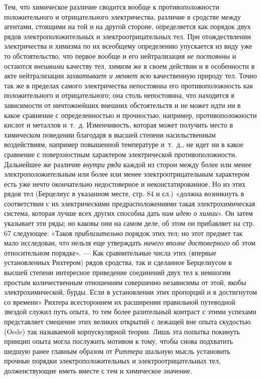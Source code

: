 Тем, что химическое различие сводится вообще к противоположности
положительного и отрицательного электричества, различие в сродстве между
агентами, стоящими на той и на другой стороне, определяется как порядок
двух рядов электроположительных и электроотрицательных тел. При
отождествлении электричества и химизма по их всеобщему определению
упускается из виду уже то обстоятельство, что первое вообще и его
нейтрализация {\em не постоянны} и остаются
{\em внешними} качеству тел, химизм же в своем действии
и в особенности в акте нейтрализации {\em захватывает и
меняет всю} качественную природу тел. Точно так же в пределах самого
электричества непостоянна его противоположность как положительного и
отрицательного; она столь непостоянна, что находится в зависимости от
ничтожнейших внешних обстоятельств и не может идти ни в какое сравнение с
определенностью и прочностью, например, противоположности кислот и металлов
и~т.~д. Изменчивость, которая может получить место в химическом поведении
благодаря в высшей степени насильственным воздействиям, например повышенной
температуре и~т.~д., не идет ни в какое сравнение с поверхностным
характером электрической противоположности. Дальнейшее же различие
{\em внутри ряда} каждой из сторон между более или
менее электроположительным или более или менее электроотрицательным
характером есть уже нечто окончательно недостоверное и неконстатированное.
Но из этих рядов тел (Берцелиус в указанном месте, стр. 84 и сл.) «должна
возникнуть в соответствии с их электрическими предрасположениями такая
электрохимическая система, которая лучше всех других способна дать нам
{\em идею о химии}». Он затем указывает эти ряды; но
каковы они на самом деле, об этом он прибавляет на стр. 67 следующее:
«Таков {\em приблизительно} порядок этих тел; но этот
предмет так мало исследован, что нельзя еще утверждать
{\em ничего вполне достоверного} об этом относительном
порядке». — Как сравнительные числа этих (впервые установленных Рихтером)
рядов сродства, так и сделанное Берцелиусом в высшей степени интересное
приведение соединений двух тел к немногим простым количественным отношениям
совершенно независимы от этой, якобы электрохимической, бурды. Если в
установлении этих пропорций и в достигнутом со времени» Рихтера
всестороннем их расширении правильной путеводной звездой служил путь опыта,
то тем более разительный контраст с этими успехами представляет смешение
этих великих открытий с лежащей вне опыта скудостью (Oede) так называемой
корпускулярной теории. Лишь эта попытка покинуть принцип опыта могла
послужить мотивом к тому, чтобы снова подхватить шедшую ранее главным
образом от {\em Риттера} шальную мысль установить
прочные порядки электроположительных и электроотрицательных тел,
долженствующие иметь вместе с тем и химическое значение.

